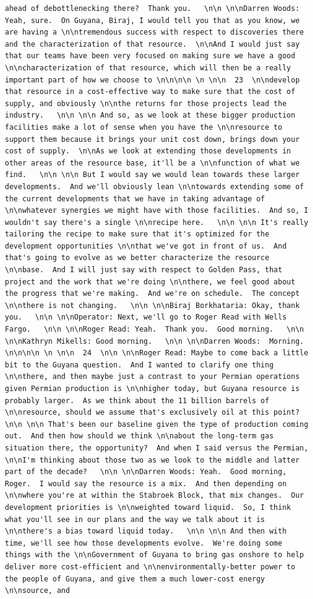 \documentclass[
  letterpaper,
  DIV=11,
  numbers=noendperiod]{scrreprt}
\begin{document}
\begin{verbatim}
ahead of debottlenecking there?  Thank you.   \n\n \n\nDarren Woods: Yeah, sure.  On Guyana, Biraj, I would tell you that as you know, we are having a \n\ntremendous success with respect to discoveries there and the characterization of that resource.  \n\nAnd I would just say that our teams have been very focused on making sure we have a good \n\ncharacterization of that resource, which will then be a really important part of how we choose to \n\n\n\n \n \n\n  23  \n\ndevelop that resource in a cost-effective way to make sure that the cost of supply, and obviously \n\nthe returns for those projects lead the industry.   \n\n \n\n And so, as we look at these bigger production facilities make a lot of sense when you have the \n\nresource to support them because it brings your unit cost down, brings down your cost of supply.  \n\nAs we look at extending those developments in other areas of the resource base, it'll be a \n\nfunction of what we find.   \n\n \n\n But I would say we would lean towards these larger developments.  And we'll obviously lean \n\ntowards extending some of the current developments that we have in taking advantage of \n\nwhatever synergies we might have with those facilities.  And so, I wouldn't say there's a single \n\nrecipe here.   \n\n \n\n It's really tailoring the recipe to make sure that it's optimized for the development opportunities \n\nthat we've got in front of us.  And that's going to evolve as we better characterize the resource \n\nbase.  And I will just say with respect to Golden Pass, that project and the work that we're doing \n\nthere, we feel good about the progress that we're making.  And we're on schedule.  The concept \n\nthere is not changing.   \n\n \n\nBiraj Borkhataria: Okay, thank you.   \n\n \n\nOperator: Next, we'll go to Roger Read with Wells Fargo.   \n\n \n\nRoger Read: Yeah.  Thank you.  Good morning.   \n\n \n\nKathryn Mikells: Good morning.   \n\n \n\nDarren Woods:  Morning.   \n\n\n\n \n \n\n  24  \n\n \n\nRoger Read: Maybe to come back a little bit to the Guyana question.  And I wanted to clarify one thing \n\nthere, and then maybe just a contrast to your Permian operations given Permian production is \n\nhigher today, but Guyana resource is probably larger.  As we think about the 11 billion barrels of \n\nresource, should we assume that's exclusively oil at this point?   \n\n \n\n That's been our baseline given the type of production coming out.  And then how should we think \n\nabout the long-term gas situation there, the opportunity?  And when I said versus the Permian, \n\nI'm thinking about those two as we look to the middle and latter part of the decade?   \n\n \n\nDarren Woods: Yeah.  Good morning, Roger.  I would say the resource is a mix.  And then depending on \n\nwhere you're at within the Stabroek Block, that mix changes.  Our development priorities is \n\nweighted toward liquid.  So, I think what you'll see in our plans and the way we talk about it is \n\nthere's a bias toward liquid today.   \n\n \n\n And then with time, we'll see how those developments evolve.  We're doing some things with the \n\nGovernment of Guyana to bring gas onshore to help deliver more cost-efficient and \n\nenvironmentally-better power to the people of Guyana, and give them a much lower-cost energy \n\nsource, and 
\end{verbatim}
\end{document}
